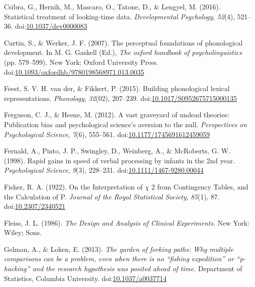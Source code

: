 \documentclass[man, noextraspace]{apa6}
\begin{document}
\leavevmode\hypertarget{ref-Csibra2016}{}%
Csibra, G., Hernik, M., Mascaro, O., Tatone, D., \& Lengyel, M. (2016). Statistical treatment of looking-time data. \emph{Developmental Psychology}, \emph{52}(4), 521--36. doi:\href{https://doi.org/10.1037/dev0000083}{10.1037/dev0000083}

\leavevmode\hypertarget{ref-Curtin2007}{}%
Curtin, S., \& Werker, J. F. (2007). The perceptual foundations of phonological development. In M. G. Gaskell (Ed.), \emph{The oxford handbook of psycholinguistics} (pp. 579--599). New York: Oxford University Press. doi:\href{https://doi.org/10.1093/oxfordhb/9780198568971.013.0035}{10.1093/oxfordhb/9780198568971.013.0035}

\leavevmode\hypertarget{ref-vanderFeest2015}{}%
Feest, S. V. H. van der, \& Fikkert, P. (2015). Building phonological lexical representations. \emph{Phonology}, \emph{32}(02), 207--239. doi:\href{https://doi.org/10.1017/S0952675715000135}{10.1017/S0952675715000135}

\leavevmode\hypertarget{ref-Ferguson2012}{}%
Ferguson, C. J., \& Heene, M. (2012). A vast graveyard of undead theories: Publication bias and psychological science's aversion to the null. \emph{Perspectives on Psychological Science}, \emph{7}(6), 555--561. doi:\href{https://doi.org/10.1177/1745691612459059}{10.1177/1745691612459059}

\leavevmode\hypertarget{ref-Fernald1998}{}%
Fernald, A., Pinto, J. P., Swingley, D., Weinberg, A., \& McRoberts, G. W. (1998). Rapid gains in speed of verbal processing by infants in the 2nd year. \emph{Psychological Science}, \emph{9}(3), 228--231. doi:\href{https://doi.org/10.1111/1467-9280.00044}{10.1111/1467-9280.00044}

\leavevmode\hypertarget{ref-Fisher1922}{}%
Fisher, R. A. (1922). On the Interpretation of \(\chi\) 2 from Contingency Tables, and the Calculation of P. \emph{Journal of the Royal Statistical Society}, \emph{85}(1), 87. doi:\href{https://doi.org/10.2307/2340521}{10.2307/2340521}

\leavevmode\hypertarget{ref-Fleiss1986}{}%
Fleiss, J. L. (1986). \emph{The Design and Analysis of Clinical Experiments}. New York: Wiley; Sons.

\leavevmode\hypertarget{ref-Gelman2013}{}%
Gelman, A., \& Loken, E. (2013). \emph{The garden of forking paths: Why multiple comparisons can be a problem, even when there is no ``fishing expedition'' or ``p-hacking'' and the research hypothesis was posited ahead of time.} Department of Statistics, Columbia University. doi:\href{https://doi.org/10.1037/a0037714}{10.1037/a0037714}
\end{document}
